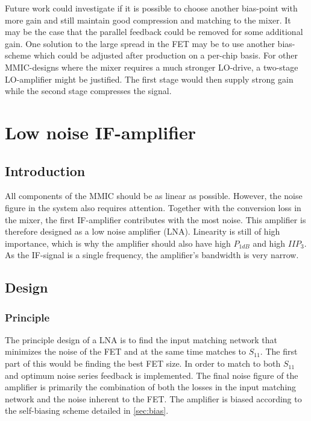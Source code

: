 		Future work could investigate if it is possible to choose another bias-point with more gain and still maintain good compression and matching to the mixer. It may be the case that the parallel feedback could be removed for some additional gain.  One solution to the large spread in the FET may be to use another bias-scheme which could be adjusted after production on a per-chip basis.
		For other MMIC-designs where the mixer requires a much stronger LO-drive, a two-stage LO-amplifier might be justified. The first stage would then supply strong gain while the second stage compresses the signal.

	\section{Low noise IF-amplifier}
		\subsection{Introduction}
			All components of the MMIC should be as linear as possible. However, the noise figure in the system also requires attention. Together with the conversion loss in the mixer, the first IF-amplifier contributes with the most noise. This amplifier is therefore designed as a low noise amplifier (LNA). Linearity is still of high importance, which is why the amplifier should also have high $P_{1dB}$ and high $IIP_3$. As the IF-signal is a single frequency, the amplifier's bandwidth is very narrow.

		\subsection{Design}
			\subsubsection{Principle}
				The principle design of a LNA is to find the input matching network that minimizes the noise of the FET and at the same time matches to $S_{11}$. The first part of this would be finding the best FET size. In order to match to both $S_{11}$ and optimum noise series feedback is implemented.\autocite{lehmann85} The final noise figure of the amplifier is primarily the combination of both the losses in the input matching network and the noise inherent to the FET. The amplifier is biased according to the self-biasing scheme detailed in \autoref{sec:bias}.

